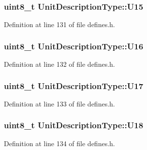 \hypertarget{structUnitDescriptionType_a67851c4a906293451b0c3e49fe79329c}{
\subsubsection[{U15}]{\setlength{\rightskip}{0pt plus 5cm}uint8\-\_\-t Unit\-Description\-Type\-::\-U15}}\label{structUnitDescriptionType_a67851c4a906293451b0c3e49fe79329c}


Definition at line 131 of file defines.\-h.

\hypertarget{structUnitDescriptionType_a7ff11ef3bf5d3e485d300dc46bfc06d7}{
\subsubsection[{U16}]{\setlength{\rightskip}{0pt plus 5cm}uint8\-\_\-t Unit\-Description\-Type\-::\-U16}}\label{structUnitDescriptionType_a7ff11ef3bf5d3e485d300dc46bfc06d7}


Definition at line 132 of file defines.\-h.

\hypertarget{structUnitDescriptionType_a21f0e4e804978c6b29699ae3ed0e5060}{
\subsubsection[{U17}]{\setlength{\rightskip}{0pt plus 5cm}uint8\-\_\-t Unit\-Description\-Type\-::\-U17}}\label{structUnitDescriptionType_a21f0e4e804978c6b29699ae3ed0e5060}


Definition at line 133 of file defines.\-h.

\hypertarget{structUnitDescriptionType_a5af9c5dc8c43c0c53b847bb0e25d8c18}{
\subsubsection[{U18}]{\setlength{\rightskip}{0pt plus 5cm}uint8\-\_\-t Unit\-Description\-Type\-::\-U18}}\label{structUnitDescriptionType_a5af9c5dc8c43c0c53b847bb0e25d8c18}


Definition at line 134 of file defines.\-h.

